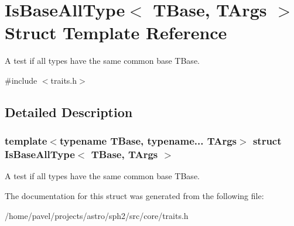 \hypertarget{structIsBaseAllType}{}\section{Is\+Base\+All\+Type$<$ T\+Base, T\+Args $>$ Struct Template Reference}
\label{structIsBaseAllType}


A test if all types have the same common base T\+Base.  




{\ttfamily \#include $<$traits.\+h$>$}



\subsection{Detailed Description}
\subsubsection*{template$<$typename T\+Base, typename... T\+Args$>$\newline
struct Is\+Base\+All\+Type$<$ T\+Base, T\+Args $>$}

A test if all types have the same common base T\+Base. 

The documentation for this struct was generated from the following file\+:\begin{DoxyCompactItemize}
\item 
/home/pavel/projects/astro/sph2/src/core/traits.\+h\end{DoxyCompactItemize}
